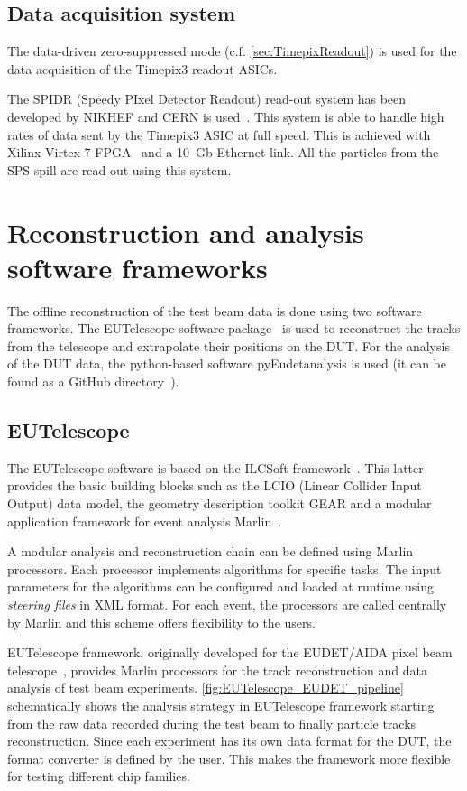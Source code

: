 \subsection{Data acquisition system}
The data-driven zero-suppressed mode (c.f. \cref{sec:TimepixReadout})
is used for the data acquisition of the Timepix3 readout ASICs. 

The SPIDR (Speedy PIxel Detector Readout) read-out system has been
developed by NIKHEF and CERN is used~\cite{Visser:2015bsa}. This
system is able to handle high rates of data sent by the Timepix3 ASIC
at full speed. This is achieved with Xilinx Virtex-7
FPGA~\cite{XilinxVirtex7} and a 10~Gb Ethernet link. All the particles
from the SPS spill are read out using this system.

\section{Reconstruction and analysis software frameworks}

The offline reconstruction of the test beam data is done using two
software frameworks. The EUTelescope software
package~\cite{Rubinskiy,EutelescopeWebsite} is used to reconstruct the
tracks from the telescope and extrapolate their positions on the
DUT. For the analysis of the DUT data, the python-based software
pyEudetanalysis is used (it can be found as a GitHub
directory~\cite{pyeudet}).

\subsection{EUTelescope}
The EUTelescope software is based on the ILCSoft
framework~\cite{Aplin:2009zz}. This latter provides the basic building
blocks such as the LCIO (Linear Collider Input Output) data model, the
geometry description toolkit GEAR and a modular application framework
for event analysis Marlin~\cite{Gaede:2006pj}.

A modular analysis and reconstruction chain can be defined using
Marlin processors. Each processor implements algorithms for specific
tasks. The input parameters for the algorithms can be configured and
loaded at runtime using \textit{steering files} in XML format. For
each event, the processors are called centrally by Marlin and this
scheme offers flexibility to the users.

EUTelescope framework, originally developed for the EUDET/AIDA pixel
beam telescope~\cite{Rubinskiy:2014kza}, provides Marlin processors
for the track reconstruction and data analysis of test beam
experiments. \cref{fig:EUTelescope_EUDET_pipeline} schematically shows
the analysis strategy in EUTelescope framework starting from the raw
data recorded during the test beam to finally particle tracks
reconstruction. Since each experiment has its own data format for the
DUT, the format converter is defined by the user. This makes the
framework more flexible for testing different chip families.

